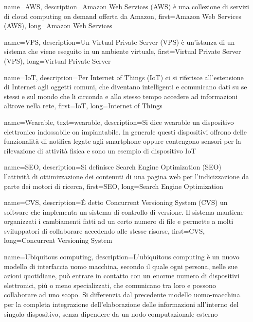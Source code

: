 {
    name={AWS},
    description={Amazon Web Services (AWS) è una collezione di servizi di cloud computing on demand offerta da Amazon},
    first={Amazon Web Services (AWS)},
    long={Amazon Web Services}
}

{
    name={VPS},
    description={Un Virtual Private Server (VPS) è un'istanza di un sistema che viene eseguito in un ambiente virtuale},
    first={Virtual Private Server (VPS)},
    long={Virtual Private Server}
}

{
    name={IoT},
    description={Per Internet of Things (IoT) ci si riferisce all'estensione di Internet agli oggetti comuni, che diventano intelligenti e comunicano dati su se stessi e sul mondo che li circonda e allo stesso tempo accedere ad informazioni altrove nella rete},
    first={IoT},
    long={Internet of Things}
}

{
    name={Wearable},
    text={wearable},
    description={Si dice wearable un dispositivo elettronico indossabile on impiantabile. In generale questi dispositivi offrono delle funzionalità di notifica legate agli smartphone oppure contengono sensori per la rilevazione di attività fisica e sono un esempio di dispositivo \gls{IoT}}
}

{
    name={SEO},
    description={Si definisce Search Engine Optimization (SEO) l'attività di ottimizzazione dei contenuti di una pagina web per l'indicizzazione da parte dei motori di ricerca},
    first={SEO},
    long={Search Engine Optimization}
}

{
    name={CVS},
    description={É detto Concurrent Versioning System (CVS) un software che implementa un sistema di controllo di versione. Il sistema mantiene organizzati i cambiamenti fatti ad un certo numero di file e permette a molti sviluppatori di collaborare accedendo alle stesse risorse},
    first={CVS},
    long={Concurrent Versioning System}
}

{
    name={Ubiquitous computing},
    description={L'ubiquitous computing è un nuovo modello di interfaccia uomo macchina, secondo il quale ogni persona, nelle sue azioni quotidiane, può entrare in contatto con un enorme numero di dispositivi elettronici, più o meno specializzati, che comunicano tra loro e possono collaborare ad uno scopo. Si differenzia dal precedente modello uomo-macchina per la completa integrazione dell'elaborazione delle informazioni all'interno del singolo dispositivo, senza dipendere da un nodo computazionale esterno}
}

